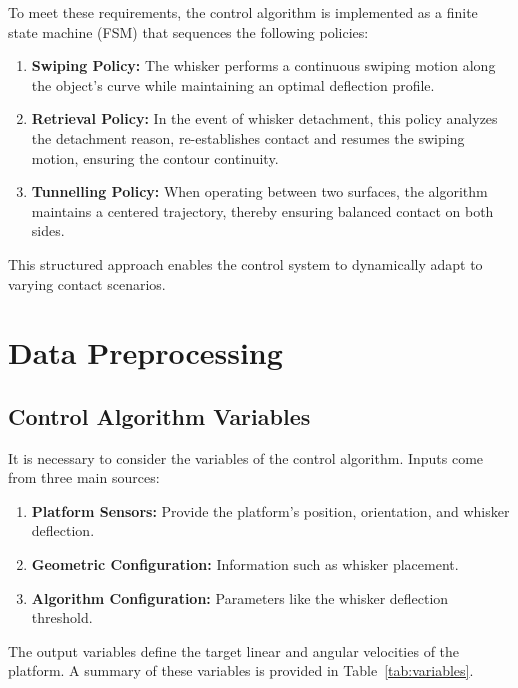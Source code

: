\noindent To meet these requirements, the control algorithm is implemented as a finite state machine (FSM) that sequences the following policies:

\begin{enumerate}
    \item \textbf{Swiping Policy:} The whisker performs a continuous swiping motion along the object's curve while maintaining an optimal deflection profile.
    \item \textbf{Retrieval Policy:} In the event of whisker detachment, this policy analyzes the detachment reason, re-establishes contact and resumes the swiping motion, ensuring the contour continuity.
    \item \textbf{Tunnelling Policy:} When operating between two surfaces, the algorithm maintains a centered trajectory, thereby ensuring balanced contact on both sides.
\end{enumerate}

This structured approach enables the control system to dynamically adapt to varying contact scenarios.


\section{Data Preprocessing}

\subsection{Control Algorithm Variables}

It is necessary to consider the variables of the control algorithm.
Inputs come from three main sources:
\begin{enumerate}
    \item \textbf{Platform Sensors:} Provide the platform's position, orientation, and whisker deflection.
    \item \textbf{Geometric Configuration:} Information such as whisker placement.
    \item \textbf{Algorithm Configuration:} Parameters like the whisker deflection threshold.
\end{enumerate}
The output variables define the target linear and angular velocities of the platform.
A summary of these variables is provided in Table~\ref{tab:variables}.

\newcommand{\branch}[3]{%
    \scalebox{0.75}{$\left\{
                         \begin{array}{@{}l@{\quad}l@{}}
                             #2, & \text{if } #1,\\[0.5em]
                             #3, & \text{otherwise.}
                         \end{array}
    \right.$}%
}


